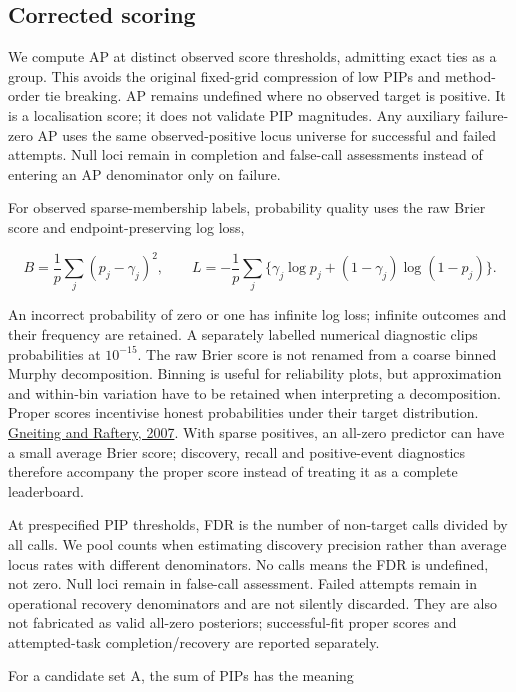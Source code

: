\documentclass[
  british,
  10pt,
]{article}
\begin{document}
\subsection{Corrected scoring}\label{corrected-scoring}

We compute AP at distinct observed score thresholds, admitting exact
ties as a group. This avoids the original fixed-grid compression of low
PIPs and method-order tie breaking. AP remains undefined where no
observed target is positive. It is a localisation score; it does not
validate PIP magnitudes. Any auxiliary failure-zero AP uses the same
observed-positive locus universe for successful and failed attempts.
Null loci remain in completion and false-call assessments instead of
entering an AP denominator only on failure.

For observed sparse-membership labels, probability quality uses the raw
Brier score and endpoint-preserving log loss,

\[B=\frac1p\sum_j(p_j-\gamma_j)^2,\qquad
L=-\frac1p\sum_j\{\gamma_j\log p_j+(1-\gamma_j)\log(1-p_j)\}.\]

An incorrect probability of zero or one has infinite log loss; infinite
outcomes and their frequency are retained. A separately labelled
numerical diagnostic clips probabilities at \(10^{-15}\). The raw Brier
score is not renamed from a coarse binned Murphy decomposition. Binning
is useful for reliability plots, but approximation and within-bin
variation have to be retained when interpreting a decomposition. Proper
scores incentivise honest probabilities under their target distribution.
\href{https://doi.org/10.1198/016214506000001437}{Gneiting and Raftery,
2007}. With sparse positives, an all-zero predictor can have a small
average Brier score; discovery, recall and positive-event diagnostics
therefore accompany the proper score instead of treating it as a
complete leaderboard.

At prespecified PIP thresholds, FDR is the number of non-target calls
divided by all calls. We pool counts when estimating discovery precision
rather than average locus rates with different denominators. No calls
means the FDR is undefined, not zero. Null loci remain in false-call
assessment. Failed attempts remain in operational recovery denominators
and are not silently discarded. They are also not fabricated as valid
all-zero posteriors; successful-fit proper scores and attempted-task
completion/recovery are reported separately.

For a candidate set A, the sum of PIPs has the meaning
\end{document}
